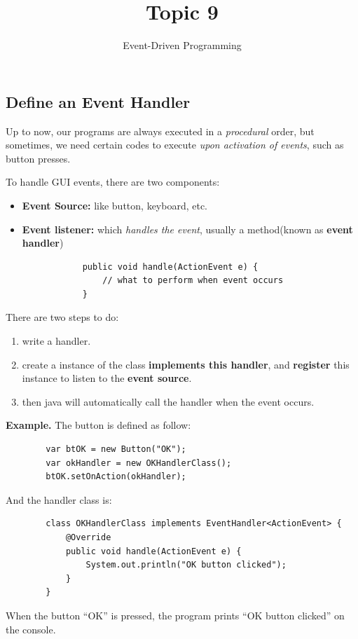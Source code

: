 \documentclass[11pt, a4paper]{COMP3021}
\title{Topic 9}
\subtitle{Event-Driven Programming}
\newcommand{\motiv}{\blue {\bf Motivation: }}
\newcommand{\eg}{\textbf{Example. }}
\begin{document}
\begin{spacing}{1.2}

    \section{Define an Event Handler}

    {\motiv Up to now, our programs are always executed in a {\it procedural}
    order, but sometimes, we need certain codes to execute {\it upon
    activation of events}, such as button presses.}

    To handle GUI events, there are two components: 
    \begin{itemize}
        \item {\bf Event Source:} like button, keyboard, etc.
        \item {\bf Event listener:} which {\it handles the event}, 
        usually a method(known as {\bf event handler})
        \begin{verbatim}
            public void handle(ActionEvent e) {
                // what to perform when event occurs
            }
        \end{verbatim}
    \end{itemize}

    There are two steps to do: 
    \begin{enumerate}
        \item write a handler.
        \item create a instance of the class {\bf implements this handler},
        and {\bf register} this instance to listen to the {\bf event source}.
        \item then java will automatically call the handler when the event occurs.
    \end{enumerate}
    \eg The button is defined as follow: 
    \begin{verbatim}
        var btOK = new Button("OK");
        var okHandler = new OKHandlerClass();
        btOK.setOnAction(okHandler);
    \end{verbatim}
    And the handler class is: 
    \begin{verbatim}
        class OKHandlerClass implements EventHandler<ActionEvent> {
            @Override
            public void handle(ActionEvent e) {
                System.out.println("OK button clicked");
            }
        }
    \end{verbatim}
    When the button ``OK'' is pressed, the program prints ``OK button clicked''
    on the console.


\end{spacing}
\end{document}
